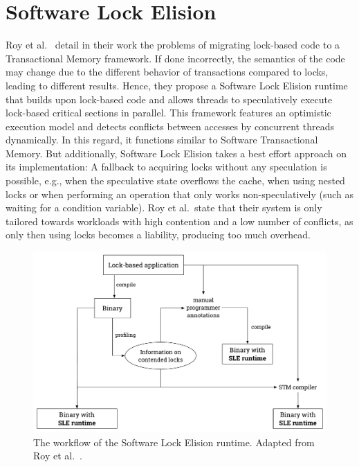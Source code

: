 \section{Software Lock Elision}%
\label{sec:related:sle}
Roy et al.~\cite{roy2009runtime} detail in their work the problems of migrating lock-based code to a Transactional Memory framework.
If done incorrectly, the semantics of the code may change due to the different behavior of transactions compared to locks, leading to different results.
Hence, they propose a Software Lock Elision runtime that builds upon lock-based code and allows threads to speculatively execute lock-based critical sections in parallel.
This framework features an optimistic execution model and detects conflicts between accesses by concurrent threads dynamically.
In this regard, it functions similar to Software Transactional Memory.
But additionally, Software Lock Elision takes a best effort approach on its implementation:
A fallback to acquiring locks without any speculation is possible, e.g., when the speculative state overflows the cache, when using nested locks or when performing an operation that only works non-speculatively (such as waiting for a condition variable).
Roy et al.\ state that their system is only tailored towards workloads with high contention and a low number of conflicts, as only then using locks becomes a liability, producing too much overhead.

\begin{figure}
    \centering
    \includegraphics[width=.9\textwidth,keepaspectratio]{gfx/related/sle}
    \caption{The workflow of the Software Lock Elision runtime. Adapted from Roy et al.~\cite{roy2009runtime}.}%
    \label{fig:related:sle}
\end{figure}

